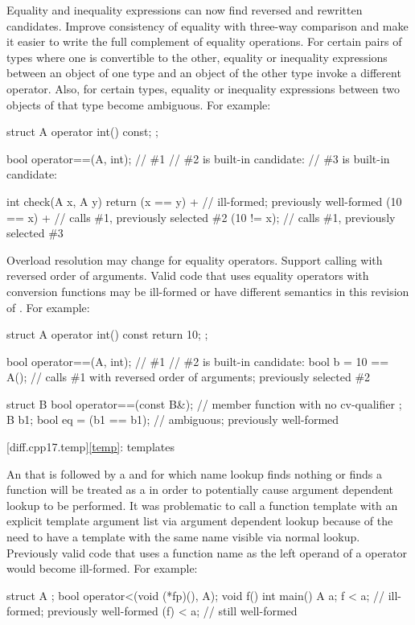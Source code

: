 \change
Equality and inequality expressions can now find
reversed and rewritten candidates.
\rationale
Improve consistency of equality with three-way comparison
and make it easier to write the full complement of equality operations.
\effect
For certain pairs of types where one is convertible to the other,
equality or inequality expressions between an object of one type
and an object of the other type invoke a different operator.
Also, for certain types, equality or inequality expressions
between two objects of that type become ambiguous.
For example:
\begin{codeblock}
struct A {
  operator int() const;
};

bool operator==(A, int);        // \#1
// \#2 is built-in candidate: 
// \#3 is built-in candidate: 

int check(A x, A y) {
  return (x == y) +             // ill-formed; previously well-formed
    (10 == x) +                 // calls \#1, previously selected \#2
    (10 != x);                  // calls \#1, previously selected \#3
}
\end{codeblock}

\change
Overload resolution may change for equality operators.
\rationale
Support calling  with reversed order of arguments.
\effect
Valid \CppXVII{} code that uses equality operators with conversion functions
may be ill-formed or have different semantics in this revision of \Cpp{}.
For example:
\begin{codeblock}
struct A {
  operator int() const { return 10; }
};

bool operator==(A, int);        // \#1
// \#2 is built-in candidate: 
bool b = 10 == A();             // calls \#1 with reversed order of arguments; previously selected \#2

struct B {
  bool operator==(const B&);    // member function with no cv-qualifier
};
B b1;
bool eq = (b1 == b1);           // ambiguous; previously well-formed
\end{codeblock}

[diff.cpp17.temp]{\ref{temp}: templates}

\change
An 
that is followed by a \tcode{<}
and for which name lookup
finds nothing or finds a function
will be treated as a 
in order to potentially cause argument dependent lookup to be performed.
\rationale
It was problematic to call a function template
with an explicit template argument list
via argument dependent lookup
because of the need to have a template with the same name
visible via normal lookup.
\effect
Previously valid code that uses a function name
as the left operand of a \tcode{<} operator
would become ill-formed.
For example:
\begin{codeblock}
struct A {};
bool operator<(void (*fp)(), A);
void f() {}
int main() {
  A a;
  f < a;    // ill-formed; previously well-formed
  (f) < a;  // still well-formed
}
\end{codeblock}

